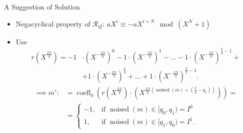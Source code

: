 \documentclass[aspectratio=169]{beamer}
\begin{document}
\begin{frame}{A Suggestion of Solution}
    \begin{itemize}
        \item Negacyclical property of $\mathcal{R}_Q$: \;\; $aX^i \equiv -aX^{i+N} \mod (X^N+1)$
    \end{itemize}
    \begin{itemize}
        \item Use
            \begin{align*}
            r(X^{\frac{2N}{q}}) = -1 & \cdot \left(X^{-\frac{2N}{q}}\right)^0 - 1 \cdot \left(X^{-\frac{2N}{q}}\right)^1 - \dots - 1 \cdot \left(X^{-\frac{2N}{q}}\right)^{\frac{q}{4}-1} + \\
            &+ 1 \cdot \left(X^{-\frac{2N}{q}}\right)^{\frac{q}{4}} + \dots + 1 \cdot \left(X^{-\frac{2N}{q}}\right)^{\frac{q}{2}-1}.
            \end{align*}
        \begin{align*}
            \implies 
            m':&=\operatorname{coeff}_0\left(r(X^{\frac{2N}{q}}) \cdot \left(X^{\frac{2N}{q}(\operatorname{noised}(m)+(\frac{q}{4}-q_1))}\right)\right) = \\
            &= \begin{cases}
              -1, & \text{if $\operatorname{noised}(m) \in [q_0, q_1) = I^0$} \\
              1, & \text{if $\operatorname{noised}(m) \in [q_1, q_0) = I^1$}.
            \end{cases}
        \end{align*}
    \end{itemize}
\end{frame}
\end{document}
